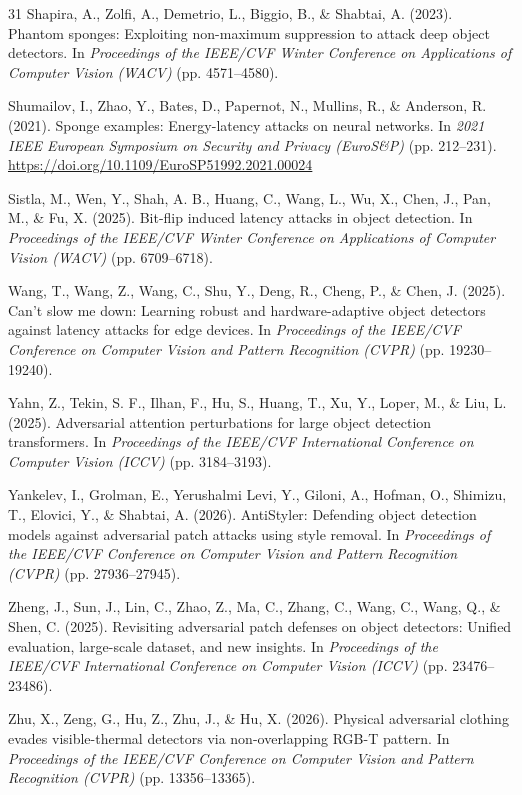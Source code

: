 \begin{thebibliography}{31}
Shapira, A., Zolfi, A., Demetrio, L., Biggio, B., \& Shabtai, A. (2023). Phantom sponges: Exploiting non-maximum suppression to attack deep object detectors. In \textit{Proceedings of the IEEE/CVF Winter Conference on Applications of Computer Vision (WACV)} (pp. 4571--4580).

Shumailov, I., Zhao, Y., Bates, D., Papernot, N., Mullins, R., \& Anderson, R. (2021). Sponge examples: Energy-latency attacks on neural networks. In \textit{2021 IEEE European Symposium on Security and Privacy (EuroS\&P)} (pp. 212--231). \url{https://doi.org/10.1109/EuroSP51992.2021.00024}

Sistla, M., Wen, Y., Shah, A. B., Huang, C., Wang, L., Wu, X., Chen, J., Pan, M., \& Fu, X. (2025). Bit-flip induced latency attacks in object detection. In \textit{Proceedings of the IEEE/CVF Winter Conference on Applications of Computer Vision (WACV)} (pp. 6709--6718).

Wang, T., Wang, Z., Wang, C., Shu, Y., Deng, R., Cheng, P., \& Chen, J. (2025). Can't slow me down: Learning robust and hardware-adaptive object detectors against latency attacks for edge devices. In \textit{Proceedings of the IEEE/CVF Conference on Computer Vision and Pattern Recognition (CVPR)} (pp. 19230--19240).

Yahn, Z., Tekin, S. F., Ilhan, F., Hu, S., Huang, T., Xu, Y., Loper, M., \& Liu, L. (2025). Adversarial attention perturbations for large object detection transformers. In \textit{Proceedings of the IEEE/CVF International Conference on Computer Vision (ICCV)} (pp. 3184--3193).

Yankelev, I., Grolman, E., Yerushalmi Levi, Y., Giloni, A., Hofman, O., Shimizu, T., Elovici, Y., \& Shabtai, A. (2026). AntiStyler: Defending object detection models against adversarial patch attacks using style removal. In \textit{Proceedings of the IEEE/CVF Conference on Computer Vision and Pattern Recognition (CVPR)} (pp. 27936--27945).

Zheng, J., Sun, J., Lin, C., Zhao, Z., Ma, C., Zhang, C., Wang, C., Wang, Q., \& Shen, C. (2025). Revisiting adversarial patch defenses on object detectors: Unified evaluation, large-scale dataset, and new insights. In \textit{Proceedings of the IEEE/CVF International Conference on Computer Vision (ICCV)} (pp. 23476--23486).

Zhu, X., Zeng, G., Hu, Z., Zhu, J., \& Hu, X. (2026). Physical adversarial clothing evades visible-thermal detectors via non-overlapping RGB-T pattern. In \textit{Proceedings of the IEEE/CVF Conference on Computer Vision and Pattern Recognition (CVPR)} (pp. 13356--13365).

\end{thebibliography}
